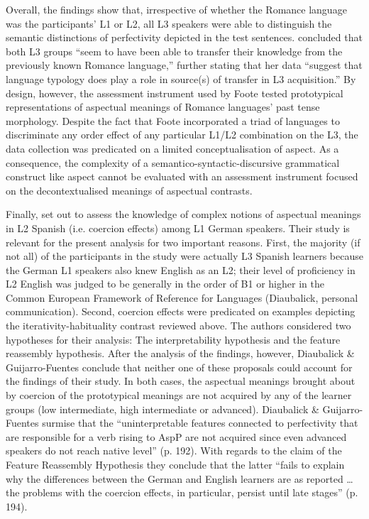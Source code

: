 \documentclass[output=paper,modfonts,nonflat,newtxmath]{langsci/langscibook}
\begin{document}
Overall, the findings show that, irrespective of whether the Romance language was the participants’ L1 or L2, all L3 speakers were able to distinguish the semantic distinctions of perfectivity depicted in the test sentences. \citet[111]{Foote2009} concluded that both L3 groups “seem to have been able to transfer their knowledge from the previously known Romance language,” further stating that her data “suggest that language typology does play a role in source(s) of transfer in L3 acquisition.” By design, however, the assessment instrument used by Foote tested prototypical representations of aspectual meanings of Romance languages’ past tense morphology. Despite the fact that Foote incorporated a triad of languages to discriminate any order effect of any particular L1/L2 combination on the L3, the data collection was predicated on a limited conceptualisation of aspect. As a consequence, the complexity of a semantico-syntactic-discursive grammatical construct like aspect cannot be evaluated with an assessment instrument focused on the decontextualised meanings of aspectual contrasts.

Finally, \citet{DiaubalickGuijarro-Fuentes2016} set out to assess the knowledge of complex notions of aspectual meanings in L2 Spanish (i.e. coercion effects) among L1 German speakers. Their study is relevant for the present analysis for two important reasons. First, the majority (if not all) of the participants in the study were actually L3 Spanish learners because the German L1 speakers also knew English as an L2; their level of proficiency in L2 English was judged to be generally in the order of B1 or higher in the Common European Framework of Reference for Languages (Diaubalick, personal communication). Second, coercion effects were predicated on examples depicting the iterativity-habituality contrast reviewed above. The authors considered two hypotheses for their analysis: The interpretability hypothesis and the feature reassembly hypothesis. After the analysis of the findings, however, Diaubalick \& Guijarro-Fuentes conclude that neither one of these proposals could account for the findings of their study. In both cases, the aspectual meanings brought about by coercion of the prototypical meanings are not acquired by any of the learner groups (low intermediate, high intermediate or advanced). Diaubalick \& Guijarro-Fuentes surmise that the “uninterpretable features connected to perfectivity that are responsible for a verb rising to AspP are not acquired since even advanced speakers do not reach native level” (p. 192). With regards to the claim of the Feature Reassembly Hypothesis they conclude that the latter “fails to explain why the differences between the German and English learners are as reported … the problems with the coercion effects, in particular, persist until late stages” (p. 194).
\end{document}
